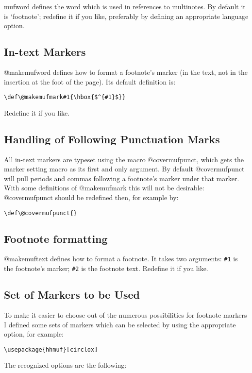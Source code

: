 \documentclass[11pt]{article}
\makeatletter
\def\macroname#1{{\ttfamily\@ttbs#1}}  %
\def\={\verb=}
\def\<#1>{\macroname{#1}}
\makeatother
\begin{document}
\<mufword> defines the word which is used in references to multinotes.
By default it is `footnote'; redefine it if you like, preferably by
defining an appropriate language option.

\subsection{In-text Markers}

\<@makemufword> defines how to format a footnote's marker (in the text, not
in the insertion at the foot of the page). Its default definition is:
\begin{verbatim}
\def\@makemufmark#1{\hbox{$^{#1}$}}
\end{verbatim}
Redefine it if you like.

\subsection{Handling of Following Punctuation Marks}

All in-text markers are typeset using the macro \<@covermufpunct>, which
gets the marker setting macro as its first and only argument.
By default \<@covermufpunct> will pull periods and commas following a
footnote's marker under that marker. With some definitions of \<@makemufmark>
this will not be desirable: \<@covermufpunct> should be redefined then,
for example by:
\begin{verbatim}
\def\@covermufpunct{}
\end{verbatim}

\subsection{Footnote formatting}

\<@makemuftext> defines how to format a footnote. It takes two arguments:
\=#1= is the footnote's marker; \=#2= is the footnote text.
Redefine it if you like.

\subsection{Set of Markers to be Used}

To make it easier to choose out of the numerous possibilities for
footnote markers I defined some sets of markers which can be selected by
using the appropriate option, for example:
\begin{verbatim}
\usepackage{hhmuf}[circlox]
\end{verbatim}
The recognized options are the following:
\end{document}
